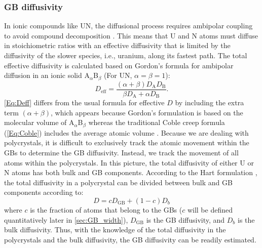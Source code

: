 \documentclass[preprint, 12pt]{elsarticle}
\newcommand{\?}{\stackrel{?}{=}}
\begin{document}
\subsubsection{GB diffusivity}
\label{Sec:GBD}


In ionic compounds like UN, the diffusional process requires ambipolar coupling to avoid compound decomposition \cite{Gordon1974}. This means that U and N atoms must diffuse in stoichiometric ratios with an effective diffusivity that is limited by the diffusivity of the slower species, i.e., uranium, along its fastest path. The total effective diffusivity is calculated based on Gordon's formula \cite{Gordon1974} for ambipolar diffusion in an ionic solid A$_{\alpha}$B$_{\beta}$ (For UN, $\alpha = \beta = 1$):
\begin{equation}
D_\mathrm{eff} = \frac{(\alpha + \beta) D_\mathrm{A} D_\mathrm{B} }{\beta D_\mathrm{A} + \alpha D_\mathrm{B}}.
\label{Eq:Deff}
\end{equation}
\cref{Eq:Deff} differs from the usual formula for effective $D$ by including the extra term $(\alpha + \beta)$, which appears because Gordon's formulation is based on the molecular volume of A$_{\alpha}$B$_{\beta}$ whereas the traditional Coble creep formula (\cref{Eq:Coble}) includes the average atomic volume \cite{Kizilyalli1999, Desai2008}. Because we are dealing with polycrystals, it is difficult to exclusively track the atomic movement within the GBs to determine the GB diffusivity. Instead, we track the movement of all atoms within the polycrystals. In this picture, the total diffusivity of either U or N atoms has both bulk and GB components. According to the Hart formulation \cite{Hart1957, Riet2021}, the total diffusivity in a polycrystal can be divided between bulk and GB components according to:
\begin{equation}
D = c D_\mathrm{GB} + (1-c) D_b
\end{equation}
where $c$ is the fraction of atoms that belong to the GBs ($c$ will be defined quantitatively later in \cref{sec:GB_width}), $D_\mathrm{GB}$ is the GB diffusivity, and $D_b$ is the bulk diffusivity. Thus, with the knowledge of the total diffusivity in the polycrystals and the bulk diffusivity, the GB diffusivity can be readily estimated. 
\end{document}
